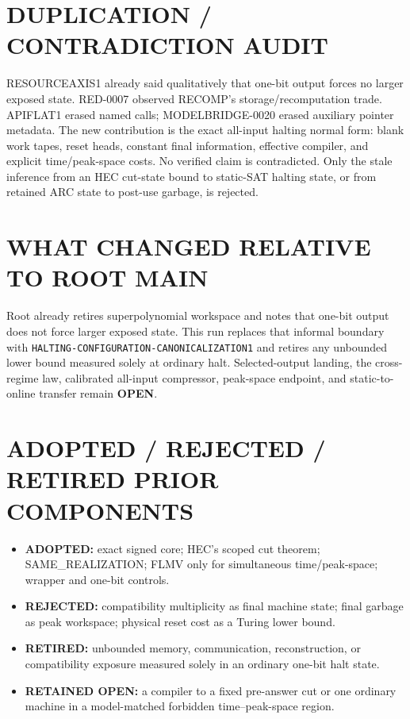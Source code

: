 \documentclass[11pt]{article}
\newcommand{\OPEN}{\textbf{OPEN}}
\begin{document}
\section{DUPLICATION / CONTRADICTION AUDIT}
RESOURCEAXIS1 already said qualitatively that one-bit output forces no larger
exposed state. RED-0007 observed RECOMP's storage/recomputation trade.
APIFLAT1 erased named calls; MODELBRIDGE-0020 erased auxiliary pointer
metadata. The new contribution is the exact all-input halting normal form:
blank work tapes, reset heads, constant final information, effective compiler,
and explicit time/peak-space costs. No verified claim is contradicted.
Only the stale inference from an HEC cut-state bound to static-SAT halting
state, or from retained ARC state to post-use garbage, is rejected.

\section{WHAT CHANGED RELATIVE TO ROOT MAIN}
Root already retires superpolynomial workspace and notes that one-bit output
does not force larger exposed state. This run replaces that informal boundary
with \texttt{HALTING-CONFIGURATION-CANONICALIZATION1} and retires any
unbounded lower bound measured solely at ordinary halt. Selected-output
landing, the cross-regime law, calibrated all-input compressor, peak-space
endpoint, and static-to-online transfer remain \OPEN.

\section{ADOPTED / REJECTED / RETIRED PRIOR COMPONENTS}
\begin{itemize}[leftmargin=1.5em]
\item \textbf{ADOPTED:} exact signed core; HEC's scoped cut theorem;
SAME\_REALIZATION; FLMV only for simultaneous time/peak-space; wrapper and
one-bit controls.
\item \textbf{REJECTED:} compatibility multiplicity as final machine state;
final garbage as peak workspace; physical reset cost as a Turing lower bound.
\item \textbf{RETIRED:} unbounded memory, communication, reconstruction, or
compatibility exposure measured solely in an ordinary one-bit halt state.
\item \textbf{RETAINED OPEN:} a compiler to a fixed pre-answer cut or one
ordinary machine in a model-matched forbidden time--peak-space region.
\end{itemize}
\end{document}
